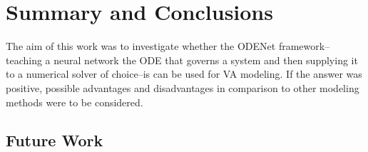 \chapter{Summary and Conclusions}
\label{chapter:conclusions}


The aim of this work was to investigate whether the ODENet framework--teaching a neural network the \ac{ODE} that governs a system and then supplying it to a numerical solver of choice--is can be used for \ac{VA} modeling. If the answer was positive, possible advantages and disadvantages in comparison to other modeling methods were to be considered.




\section{Future Work}

